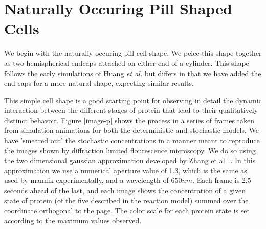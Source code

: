 \documentclass[letterpaper,twocolumn,amsmath,amssymb,pre]{revtex4-1}
\begin{document}
\section{Naturally Occuring Pill Shaped Cells}

We begin with the naturally occuring pill cell shape.  We peice this
shape together as two hemispherical endcaps attached on either end of
a cylinder.  This shape follows the early simulations of Huang
\emph{et al.} but differs in that we have added the end caps for a
more natural shape, expecting similar results.

This simple cell shape is a good starting point for observing in
detail the dynamic interaction between the different stages of protein
that lead to their qualitatively distinct behavoir. Figure
\ref{image-p} shows the process in a series of frames taken from
simulation animations for both the deterministic and stochastic
models.  We have 'smeared out' the stochastic concentrations in a
manner meant to reproduce the images shown by diffraction limited
flourescence microscopy.  We do so using the two dimensional gaussian
approximation developed by Zhang et all~\cite{zhang2007gaussian}.  In
this approximation we use a numerical aperture value of 1.3, which is
the same as used by mannik experimentally, and a wavelength of
$650nm$.  Each frame is 2.5 seconds ahead of the last, and each image
shows the concentration of a given state of protein (of the five
described in the reaction model) summed over the coordinate orthogonal
to the page.  The color scale for each protein state is set according
to the maximum values observed.
\end{document}
